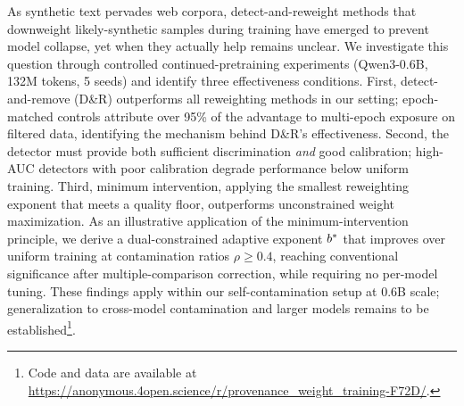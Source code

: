 As synthetic text pervades web corpora, detect-and-reweight methods that downweight likely-synthetic samples during training have emerged to prevent model collapse, yet when they actually help remains unclear.
We investigate this question through controlled continued-pretraining experiments (Qwen3-0.6B, 132M tokens, 5 seeds) and identify three effectiveness conditions.
First, detect-and-remove (D\&R) outperforms all reweighting methods in our setting; epoch-matched controls attribute over 95\% of the advantage to multi-epoch exposure on filtered data, identifying the mechanism behind D\&R's effectiveness.
Second, the detector must provide both sufficient discrimination \emph{and} good calibration; high-AUC detectors with poor calibration degrade performance below uniform training.
Third, minimum intervention, applying the smallest reweighting exponent that meets a quality floor, outperforms unconstrained weight maximization.
As an illustrative application of the minimum-intervention principle, we derive a dual-constrained adaptive exponent $b^*$ that improves over uniform training at contamination ratios $\rho \geq 0.4$, reaching conventional significance after multiple-comparison correction, while requiring no per-model tuning.
These findings apply within our self-contamination setup at 0.6B scale; generalization to cross-model contamination and larger models remains to be established\footnote{Code and data are available at \url{https://anonymous.4open.science/r/provenance_weight_training-F72D/}.}.
